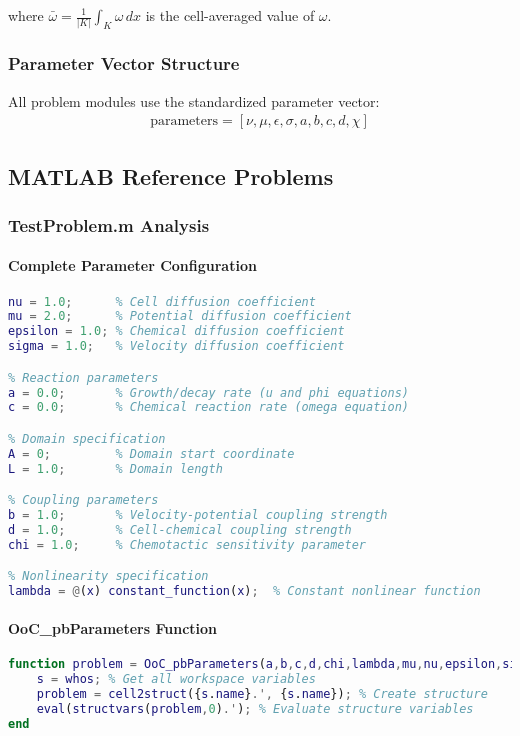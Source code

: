 where $\bar{\omega} = \frac{1}{|K|} \int_K \omega \, dx$ is the cell-averaged value of $\omega$.

\subsubsection{Parameter Vector Structure}

All problem modules use the standardized parameter vector:
\begin{align}
\text{parameters} = [\nu, \mu, \epsilon, \sigma, a, b, c, d, \chi]
\end{align}

\subsection{MATLAB Reference Problems}
\label{subsec:matlab_reference_detailed}

\subsubsection{TestProblem.m Analysis}

\paragraph{Complete Parameter Configuration}
\begin{lstlisting}[language=Matlab, caption=TestProblem.m Full Parameter Setup]
% Viscosity parameters (diffusion coefficients)
nu = 1.0;      % Cell diffusion coefficient
mu = 2.0;      % Potential diffusion coefficient  
epsilon = 1.0; % Chemical diffusion coefficient
sigma = 1.0;   % Velocity diffusion coefficient

% Reaction parameters
a = 0.0;       % Growth/decay rate (u and phi equations)
c = 0.0;       % Chemical reaction rate (omega equation)

% Domain specification
A = 0;         % Domain start coordinate
L = 1.0;       % Domain length

% Coupling parameters
b = 1.0;       % Velocity-potential coupling strength
d = 1.0;       % Cell-chemical coupling strength
chi = 1.0;     % Chemotactic sensitivity parameter

% Nonlinearity specification
lambda = @(x) constant_function(x);  % Constant nonlinear function
\end{lstlisting}

\paragraph{OoC\_pbParameters Function}
\begin{lstlisting}[language=Matlab, caption=Parameter Structure Creation]
function problem = OoC_pbParameters(a,b,c,d,chi,lambda,mu,nu,epsilon,sigma,A,L)
    s = whos; % Get all workspace variables
    problem = cell2struct({s.name}.', {s.name}); % Create structure
    eval(structvars(problem,0).'); % Evaluate structure variables
end
\end{lstlisting}

